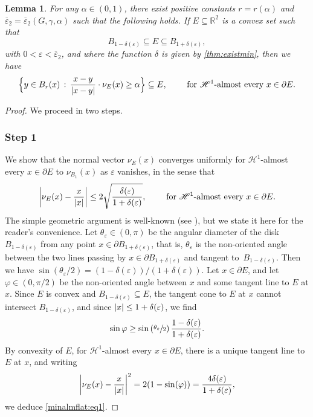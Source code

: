 \documentclass[JEP,XML,SOM,Unicode,published]{cedram}
\newcommand{\sep}{\,:\,}
\numberwithin{equation}{section}
\theoremstyle{plain}
\newtheorem{lem}[thm]{Lemma}
\theoremstyle{definition}
\newcommand{\numberset}[1]{{\mathbb{#1}}}
\newcommand{\R}{\numberset{R}}
\newcommand{\calH}{{\mathscr{H}}}
\let\eps\varepsilon
\let\vphi\varphi
\let\ol\overline
\newcommand{\subsq}{\subseteq}
\DeclarePairedDelimiter{\abs}{\lvert}{\rvert}
\begin{document}
\begin{lem}\label{lem:minalmflat}
For any $\alpha\in(0,1)$, there exist positive constants $r=r(\alpha)$ and
$\ol{\eps}_2=\ol{\eps}_2(G,\gamma,\alpha)$ such that the following holds. If $E\subsq\R^2$ is a
convex set such that
\[
B_{1-\delta(\eps)} \subsq E \subsq B_{1+\delta(\eps)},
\]
with $0<\eps<\ol{\eps}_2$, and where the function $\delta$ is given by \cref{thm:existmin}, then we
have
\begin{equation}\label{minalmflat:res1}
\Bigl\{ y\in B_r(x)\sep  \frac{x-y}{\abs{x-y}}\cdot \nu_E(x)\geq \alpha\Bigr\}
\subsq E,\qquad\text{ for }\calH^1\text{-almost every }x\in\partial E.
\end{equation}
\end{lem}

\begin{proof}
We proceed in two steps.
\subsubsection*{Step 1}
We show that the normal vector $\nu_E(x)$ converges uniformly for $\calH^1$-almost every
$x\in\partial E$ to $\nu_{B_1}(x)$ as $\eps$ vanishes, in the sense that
\begin{equation}\label{minalmflat:eq1}
\abs*{\nu_E(x)-\frac{x}{\abs{x}}}\leq 2\sqrt{\frac{\delta(\eps)}{1+\delta(\eps)}},
\qquad \text{ for }\calH^1\text{-almost every }x\in\partial E.
\end{equation}
The simple geometric argument is well-known (see \eg \cite{Oss1987,Fug1989}), but we state it
here for the reader's convenience.
Let $\theta_\eps\in (0,\pi)$ be the angular diameter of the disk $B_{1-\delta(\eps)}$ from
any point $x\in\partial B_{1+\delta(\eps)}$, that is, $\theta_\eps$ is the non-oriented angle
between the two lines passing by $x\in \partial B_{1+\delta(\eps)}$ and tangent
to~$B_{1-\delta(\eps)}$. Then we have
$\sin\left(\theta_\eps/2\right)=(1-\delta(\eps))/(1+\delta(\eps))$.
Let $x\in\partial E$, and let $\vphi\in (0,\pi/2)$ be the non-oriented angle between $x$ and
some tangent line to $E$ at $x$.
Since $E$ is convex and $B_{1-\delta(\eps)}\subsq E$, the tangent cone to $E$ at $x$ cannot
intersect $B_{1-\delta(\eps)}$, and since $\abs{x}\leq 1+\delta(\eps)$, we find
\[
\sin\vphi\geq\sin\left(\sfrac{\theta_\eps}{2}\right)\frac{1-\delta(\eps)}{1+\delta(\eps)}.
\]
By convexity of $E$, for $\calH^1$-almost every $x\in\partial E$, there is a unique tangent line to
$E$ at $x$, and writing
\[
\abs*{\nu_E(x)-\frac{x}{\abs{x}}}^2 = 2(1-\sin(\vphi))
=\frac{4\delta(\eps)}{1+\delta(\eps)},
\]
we deduce \cref{minalmflat:eq1}.


\end{proof}
\end{document}
